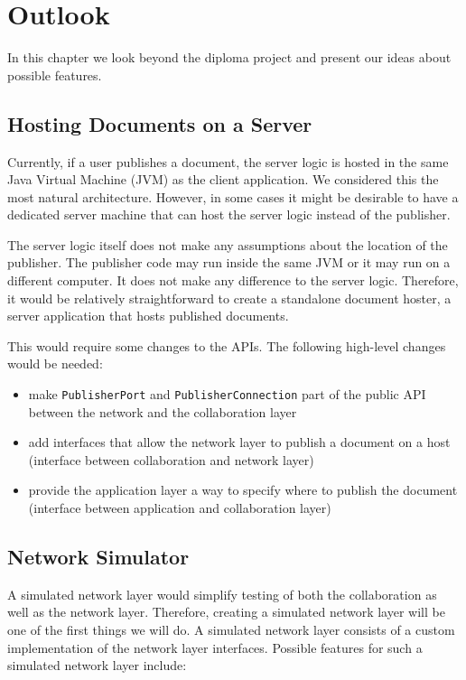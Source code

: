 \chapter{Outlook}
\label{chapter:outlook}

In this chapter we look beyond the diploma project and present our ideas about possible features.



\section{Hosting Documents on a Server}
Currently, if a user publishes a document, the server logic is hosted
in the same Java Virtual Machine (JVM) as the client application. We considered
this the most natural architecture. However, in some cases it might be
desirable to have a dedicated server machine that can host the server
logic instead of the publisher.

The server logic itself does not make any assumptions about the location
of the publisher. The publisher code may run inside the same JVM or it may run
on a different computer. It does not make any difference to the server logic.
Therefore, it would be relatively straightforward to create a standalone
document hoster, a server application that hosts published documents.

This would require some changes to the APIs. The following high-level
changes would be needed:

\begin{itemize}
 \item make \texttt{PublisherPort} and \texttt{PublisherConnection} part of the public API between the network and the collaboration layer
 \item add interfaces that allow the network layer to publish a document on a host (interface between collaboration and network layer)
 \item provide the application layer a way to specify where to publish the document (interface between application and collaboration layer)
\end{itemize}



\section{Network Simulator}
A simulated network layer would simplify testing of both the collaboration as 
well as the network layer. Therefore, creating a simulated network layer
will be one of the first things we will do. A simulated network layer
consists of a custom implementation of the network layer interfaces. Possible 
features for such a simulated network layer include:

